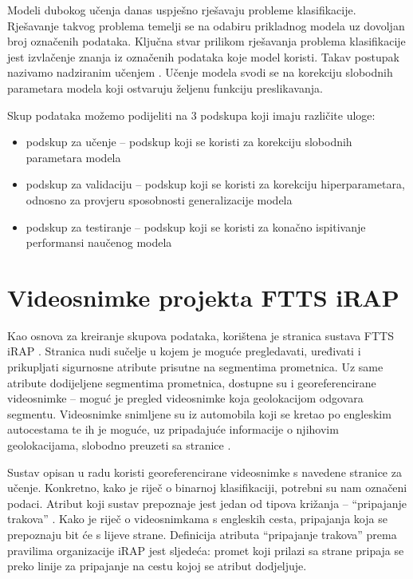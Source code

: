 \documentclass[times, utf8, diplomski, numeric]{fer}
\begin{document}
Modeli dubokog učenja danas uspješno rješavaju probleme klasifikacije. Rješavanje takvog problema temelji se na odabiru prikladnog modela uz dovoljan broj označenih podataka. 
Ključna stvar prilikom rješavanja problema klasifikacije jest izvlačenje znanja iz označenih podataka koje model koristi. Takav postupak nazivamo nadziranim učenjem \citep{book:deeplearningbook}. 
Učenje modela svodi se na korekciju slobodnih parametara modela koji ostvaruju željenu funkciju preslikavanja.

Skup podataka možemo podijeliti na 3 podskupa koji imaju različite uloge:
\begin{itemize}
 \item podskup za učenje -- podskup koji se koristi za korekciju slobodnih parametara modela
 \item podskup za validaciju -- podskup koji se koristi za korekciju hiperparametara, odnosno za provjeru sposobnosti generalizacije modela
 \item podskup za testiranje -- podskup koji se koristi za konačno ispitivanje performansi naučenog modela
\end{itemize}


\section{Videosnimke projekta FTTS iRAP}

Kao osnova za kreiranje skupova podataka, korištena je stranica sustava FTTS iRAP \citep{url:ftts_irap}. 
Stranica nudi sučelje u kojem je moguće pregledavati, uređivati i prikupljati sigurnosne atribute prisutne na segmentima prometnica.
Uz same atribute dodijeljene segmentima prometnica, dostupne su i georeferencirane videosnimke -- moguć je pregled videosnimke koja geolokacijom odgovara segmentu.
Videosnimke snimljene su iz automobila koji se kretao po engleskim autocestama te ih je moguće, uz pripadajuće informacije o njihovim geolokacijama, slobodno preuzeti sa stranice \citep{url:ftts_irap}.

Sustav opisan u radu koristi georeferencirane videosnimke s navedene stranice za učenje. Konkretno, kako je riječ o binarnoj klasifikaciji, potrebni su nam označeni podaci. 
Atribut koji sustav prepoznaje jest jedan od tipova križanja -- ``pripajanje trakova'' . Kako je riječ o videosnimkama s engleskih cesta, pripajanja koja se prepoznaju bit će s lijeve strane.
Definicija atributa ``pripajanje trakova'' prema pravilima organizacije iRAP \citep{man:ftts_irap_coding_manual} jest sljedeća: promet koji prilazi sa strane pripaja se preko linije za pripajanje na cestu kojoj se atribut dodjeljuje.
\end{document}
